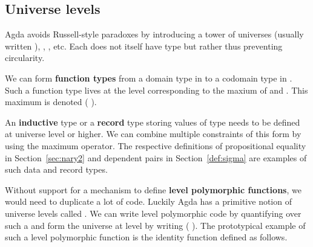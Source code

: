 
\subsection{Universe levels}\label{appendix:agda:level}

Agda avoids Russell-style paradoxes by introducing a tower of universes
 (usually written ), , , etc. Each
 does not itself have type  but rather  thus
preventing circularity.

We can form {\bf function types} from a domain type in  to a codomain
type in . Such a function type lives at the level corresponding
to the maxium of  and . This maximum is denoted {(  )}.

An {\bf inductive} type or a {\bf record} type storing values of type 
needs to be defined at universe level  or higher. We can combine multiple
constraints of this form by using the maximum operator. The respective definitions
of propositional equality in Section~\ref{sec:nary2} and dependent pairs in
Section~\ref{def:sigma} are examples of such data and record types.

Without support for a mechanism to define {\bf level polymorphic functions},
we would need to duplicate a lot of code. Luckily Agda has a primitive notion
of universe levels called . We can write level polymorphic code by
quantifying over such a   and form the universe at level
 by writing ( ). The prototypical example of such a level
polymorphic function is the identity function  defined as follows.

